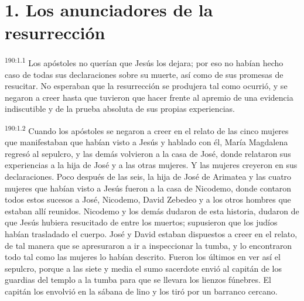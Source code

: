 \section*{1. Los anunciadores de la resurrección}
\par 
\textsuperscript{190:1.1} Los apóstoles no querían que Jesús los dejara; por eso no habían hecho caso de todas sus declaraciones sobre su muerte, así como de sus promesas de resucitar. No esperaban que la resurrección se produjera tal como ocurrió, y se negaron a creer hasta que tuvieron que hacer frente al apremio de una evidencia indiscutible y de la prueba absoluta de sus propias experiencias.

\par 
\textsuperscript{190:1.2} Cuando los apóstoles se negaron a creer en el relato de las cinco mujeres que manifestaban que habían visto a Jesús y hablado con él, María Magdalena regresó al sepulcro, y las demás volvieron a la casa de José, donde relataron sus experiencias a la hija de José y a las otras mujeres. Y las mujeres creyeron en sus declaraciones. Poco después de las seis, la hija de José de Arimatea y las cuatro mujeres que habían visto a Jesús fueron a la casa de Nicodemo, donde contaron todos estos sucesos a José, Nicodemo, David Zebedeo y a los otros hombres que estaban allí reunidos. Nicodemo y los demás dudaron de esta historia, dudaron de que Jesús hubiera resucitado de entre los muertos; supusieron que los judíos habían trasladado el cuerpo. José y David estaban dispuestos a creer en el relato, de tal manera que se apresuraron a ir a inspeccionar la tumba, y lo encontraron todo tal como las mujeres lo habían descrito. Fueron los últimos en ver así el sepulcro, porque a las siete y media el sumo sacerdote envió al capitán de los guardias del templo a la tumba para que se llevara los lienzos fúnebres. El capitán los envolvió en la sábana de lino y los tiró por un barranco cercano.

